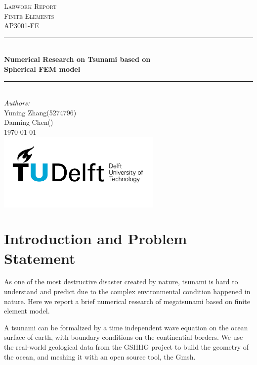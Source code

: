 \documentclass[a4paper]{article}
\begin{document}
\begin{titlepage}

\newcommand{\HRule}{\rule{\linewidth}{0.5mm}} 							%
\center 
 
\textsc{\LARGE Labwork Report}\\[1cm]

\textsc{\Large Finite Elements}\\[0.2cm]
\textsc{\large AP3001-FE}\\[1cm] 										%
\HRule \\[0.8cm]
{ \huge \bfseries Numerical Research on Tsunami based on} \\[0.5cm]
{ \huge \bfseries Spherical FEM model} \\[1cm]			%
\HRule \\[1.8cm]
\large
\emph{Authors:}\\[0.5cm]
Yuning Zhang(5274796)\\
Danning Chen()\\[1.5cm]						%
{\large \today}\\[5cm]
\includegraphics[width=0.6\textwidth]{images/TU_delft_logo.jpg}\\[1cm] 	%
\vfill 
\end{titlepage}


\section{Introduction and Problem Statement}

As one of the most destructive disaster created by nature, tsunami is hard to understand and predict due to 
the complex environmental condition happened in nature.
Here we report a brief numerical research of megatsunami based on finite element model.

A tsunami can be formalized by a time independent wave equation on the ocean surface of earth,
with boundary conditions on the continential borders. 
We use the real-world geological data from the GSHHG project \cite{wessel1996global} to build the geometry of the ocean, 
and meshing it with an open source tool, the Gmsh\cite{geuzaine2009gmsh}.%
\end{document}
